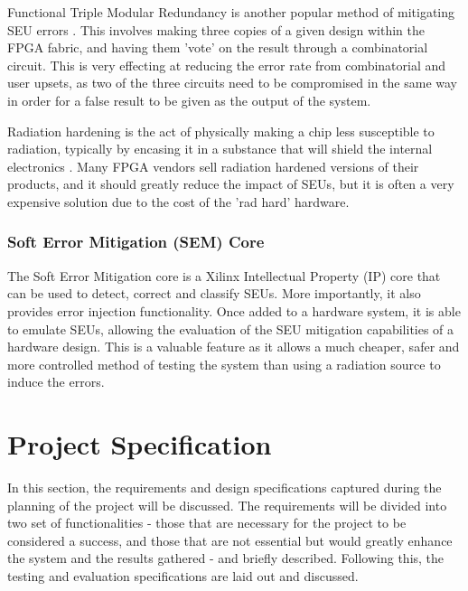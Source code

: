 \documentclass[12pt]{article}
\begin{document}
Functional Triple Modular Redundancy is another popular method of mitigating SEU errors \cite{FTripleMR}. This involves making three copies of a given design within the FPGA fabric, and having them 'vote' on the result through a combinatorial circuit. This is very effecting at reducing the error rate from combinatorial and user upsets, as two of the three circuits need to be compromised in the same way in order for a false result to be given as the output of the system.

Radiation hardening is the act of physically making a chip less susceptible to radiation, typically by encasing it in a substance that will shield the internal electronics \cite{RadHardFpga}. Many FPGA vendors sell radiation hardened versions of their products, and it should greatly reduce the impact of SEUs, but it is often a very expensive solution due to the cost of the 'rad hard' hardware.

\subsubsection{Soft Error Mitigation (SEM) Core}
\label{sec:Background-FPGAsAndSpaceApplications-SEM}

The Soft Error Mitigation core is a Xilinx Intellectual Property (IP) core that can be used to detect, correct and classify SEUs. More importantly, it also provides error injection functionality\cite{SEM}. Once added to a hardware system, it is able to emulate SEUs, allowing the evaluation of the SEU mitigation capabilities of a hardware design. This is a valuable feature as it allows a much cheaper, safer and more controlled method of testing the system than using a radiation source to induce the errors. 

\newpage

\section{Project Specification}
\label{sec:ProjSpec}

In this section, the requirements and design specifications captured during the planning of the project will be discussed. The requirements will be divided into two set of functionalities - those that are necessary for the project to be considered a success, and those that are not essential but would greatly enhance the system and the results gathered - and briefly described. Following this, the testing and evaluation specifications are laid out and discussed.
\end{document}
